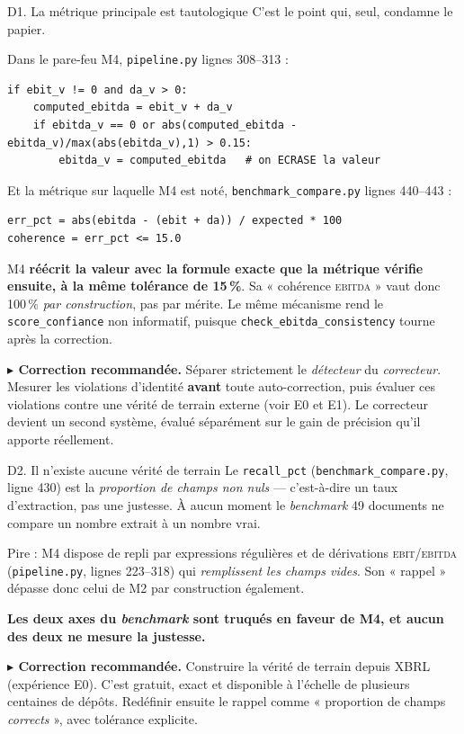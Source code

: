 \documentclass[11pt,a4paper]{article}
\newcommand{\corr}[1]{%
  \par\vspace{4pt}%
  \noindent\textbf{\textcolor{cExp}{$\blacktriangleright$ Correction recommandée.}} #1%
}
\newcommand{\fic}[1]{\texttt{\small #1}}
\begin{document}
\begin{fatal}{D1. La métrique principale est tautologique}
C'est le point qui, seul, condamne le papier.

Dans le pare-feu M4, \fic{pipeline.py} lignes 308--313 :
\begin{lstlisting}
if ebit_v != 0 and da_v > 0:
    computed_ebitda = ebit_v + da_v
    if ebitda_v == 0 or abs(computed_ebitda - ebitda_v)/max(abs(ebitda_v),1) > 0.15:
        ebitda_v = computed_ebitda   # on ECRASE la valeur
\end{lstlisting}

Et la métrique sur laquelle M4 est noté, \fic{benchmark\_compare.py}
lignes 440--443 :
\begin{lstlisting}
err_pct = abs(ebitda - (ebit + da)) / expected * 100
coherence = err_pct <= 15.0
\end{lstlisting}

M4 \textbf{réécrit la valeur avec la formule exacte que la métrique vérifie
ensuite, à la même tolérance de 15\,\%}. Sa « cohérence \textsc{ebitda} » vaut
donc 100\,\% \emph{par construction}, pas par mérite. Le même mécanisme rend le
\fic{score\_confiance} non informatif, puisque \fic{check\_ebitda\_consistency}
tourne après la correction.

\corr{Séparer strictement le \emph{détecteur} du \emph{correcteur}. Mesurer les
violations d'identité \textbf{avant} toute auto-correction, puis évaluer ces
violations contre une vérité de terrain externe (voir E0 et E1). Le correcteur
devient un second système, évalué séparément sur le gain de précision qu'il
apporte réellement.}
\end{fatal}

\begin{fatal}{D2. Il n'existe aucune vérité de terrain}
Le \fic{recall\_pct} (\fic{benchmark\_compare.py}, ligne 430) est la
\emph{proportion de champs non nuls} --- c'est-à-dire un taux d'extraction, pas
une justesse. À aucun moment le \textit{benchmark} 49 documents ne compare un
nombre extrait à un nombre vrai.

Pire : M4 dispose de repli par expressions régulières et de dérivations
\textsc{ebit}/\textsc{ebitda} (\fic{pipeline.py}, lignes 223--318) qui
\emph{remplissent les champs vides}. Son « rappel » dépasse donc celui de M2 par
construction également.

\textbf{Les deux axes du \textit{benchmark} sont truqués en faveur de M4, et
aucun des deux ne mesure la justesse.}

\corr{Construire la vérité de terrain depuis XBRL (expérience E0). C'est
gratuit, exact et disponible à l'échelle de plusieurs centaines de dépôts.
Redéfinir ensuite le rappel comme « proportion de champs \emph{corrects} »,
avec tolérance explicite.}
\end{fatal}
\end{document}
